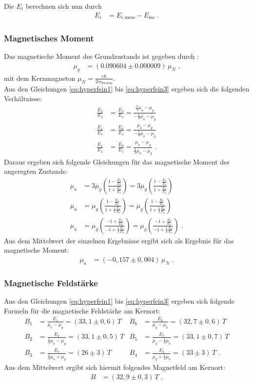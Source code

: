 Die $E_i$ berechnen sich nun durch
\begin{align}
	E_i&=E_{i,\text{mess}}-E_\text{iso}\text{ .}
\end{align}

\subsubsection{Magnetisches Moment}
Das magnetische Moment des Grundzustands ist gegeben durch \cite{schatz}:
\begin{align}
	\mu_g&=(0.090604\pm0.000009)\,\mu_N\text{ ,}
\end{align}
mit dem Kernmagneton $\mu_N=\frac{e\hbar}{2m_\text{Proton}}$.\\

Aus den Gleichungen \ref{eq:hyperfein1} bis \ref{eq:hyperfein3} ergeben sich die folgenden Verhältnisse:
\begin{align}
	\frac{E_2}{E_3}&=\frac{E_5}{E_4}=\frac{\frac13\mu_a-\mu_g}{-\frac13\mu_a-\mu_g}\label{eq:}\\
	\frac{E_1}{E_3}&=\frac{E_6}{E_4}=\frac{\mu_a-\mu_g}{-\frac13\mu_a-\mu_g}\\
	\frac{E_1}{E_2}&=\frac{E_6}{E_5}=\frac{\mu_a-\mu_g}{\frac13\mu_a-\mu_g}\text{ .}
\end{align}
Daraus ergeben sich folgende Gleichungen für das magnetische Moment des angeregten Zustands:
\begin{align}
	\mu_a&	=3\mu_g\left(\frac{1-\frac{E_2}{E_3}}{1+\frac{E_2}{E_3}}\right)
			=3\mu_g\left(\frac{1-\frac{E_5}{E_4}}{1+\frac{E_5}{E_4}}\right)\\
	\mu_a&	=\mu_g\left(\frac{1-\frac{E_1}{E_3}}{1+\frac13\frac{E_1}{E_3}}\right)
			=\mu_g\left(\frac{1-\frac{E_6}{E_4}}{1+\frac13\frac{E_6}{E_4}}\right)\\
	\mu_a&	=\mu_g\left(\frac{-1+\frac{E_1}{E_2}}{-1+\frac13\frac{E_1}{E_2}}\right)
			=\mu_g\left(\frac{-1+\frac{E_6}{E_5}}{-1+\frac13\frac{E_6}{E_5}}\right)\text{ .}
\end{align}
Aus dem Mittelwert der einzelnen Ergebnisse ergibt sich als Ergebnis für das magnetische Moment:
\begin{align}
	\mu_a&=(-0,157\pm0,004)\,\mu_N\text{ .}
\end{align}
\subsubsection{Magnetische Feldstärke}
Aus den Gleichungen \ref{eq:hyperfein1} bis \ref{eq:hyperfein3} ergeben sich folgende Formeln für die magnetische Feldstärke am Kernort:
\begin{align}
	B_1&=\frac{E_1}{\mu_a-\mu_g}=(33,1\pm0,6)\,\si{T}&
	B_6&=\frac{E_6}{\mu_g-\mu_a}=(32,7\pm0,6)\,\si{T}\\
	B_2&=\frac{E_2}{\frac13\mu_a-\mu_g}=(33,1\pm0,5)\,\si{T}&
	B_5&=\frac{E_5}{\mu_g-\frac13\mu_a}=(33,1\pm0,7)\,\si{T}\\
	B_3&=\frac{E_3}{\frac13\mu_a+\mu_g}=(26\pm3)\,\si{T}&
	B_4&=\frac{E_4}{\mu_g+\frac13\mu_a}=(33\pm3)\,\si{T}
	\text{ .}
\end{align}
Aus dem Mittelwert ergibt sich hiermit folgendes Magnetfeld am Kernort:
\begin{align}
	B&=(32,9\pm0,3)\,\si{T}\text{ .}
\end{align}
